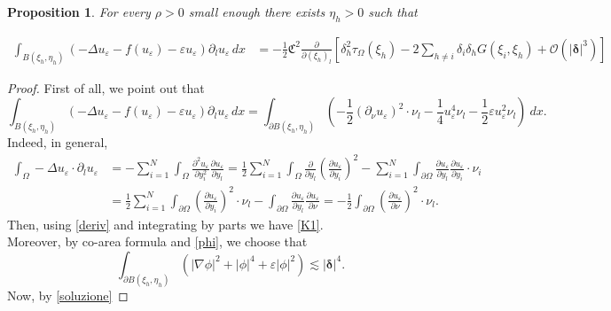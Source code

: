\documentclass[11pt,a4paper]{amsart}
\newcommand{\e}{\varepsilon}
\renewcommand{\d }{\delta }
\renewcommand{\O}{\mathcal{O}}
\newtheorem{proposition}[theorem]{Proposition}
\theoremstyle{definition}
\renewcommand{\(}{\left(}
\renewcommand{\)}{\right)}
\begin{document}
\begin{proposition}\label{espansione2}
For every $\rho>0$ small enough there exists $\eta_h>0$ such that 

\begin{equation}\label{sysj}\begin{aligned}
\int_{B(\xi_h, \eta_h)} \left(-\Delta u_\e -f(u_\e)-\e u_\e\right)\partial_l u_\e\, dx &= -\frac 12\mathfrak C^2\frac{\partial}{\partial(\xi_h)_l}\left[\d_h^2\tau_\Omega(\xi_h)-2\sum_{h\neq i}\d_i\d_hG(\xi_i,\xi_h)+\O\(|\pmb\d|^3\)\right]
\end{aligned}
\end{equation}
\end{proposition}
\begin{proof}
First of all, we point out that
\begin{equation}\label{K1}
\int_{B(\xi_h, \eta_h)} \left(-\Delta u_\e -f(u_\e)-\e u_\e\right)\partial_l u_\e\, dx = \int_{\partial B(\xi_h, \eta_h)} \left( -\frac{1}{2} (\partial_{\nu} u_{\e})^{2} \cdot \nu_l - \frac{1}{4} u_\e^{4} \nu_{l} - \frac{1}{2} \e u_\e^{2} \nu_l \right) \ dx.
\end{equation} 
Indeed, in general, 
\begin{equation}\label{deriv}
\begin{aligned}
\int_{\Omega} - \Delta u_\e \cdot \partial_l u_\e & = - \sum_{i=1}^{N} \int_{\Omega}  \frac{\partial^2 u_\e}{\partial y_i^2} \frac{\partial u_\e}{\partial y_l} = \frac 12 \sum_{i=1}^{N} \int_{\Omega} \frac{\partial}{\partial y_l} \left( \frac{\partial u_\e}{\partial y_i} \right)^2 - \sum_{i=1}^{N} \int_{\partial \Omega} \frac{\partial u_\e}{\partial y_l} \frac{\partial u_\e}{\partial y_i} \cdot \nu_i
\\& = \frac 12 \sum_{i=1}^{N} \int_{\partial\Omega} \left( \frac{\partial u_\e}{\partial y_i} \right)^2 \cdot \nu_l - \int_{\partial \Omega} \frac{\partial u_\e}{\partial y_l} \frac{\partial u_\e}{\partial \nu} = -\frac 12 \int_{\partial \Omega} \left( \frac{\partial u_\e}{\partial \nu} \right)^2 \cdot \nu_l.
\end{aligned}
\end{equation}
Then, using \eqref{deriv} and integrating by parts we have \eqref{K1}. \ \\
Moreover, by co-area formula and \eqref{phi}, we choose that 
\begin{equation}\label{K2}
\int_{\partial B(\xi_h, \eta_h)} (|\nabla \phi|^{2} + |\phi|^{4} + \e|\phi|^{2}) \lesssim |\pmb\d|^4.
\end{equation}
Now, by \eqref{soluzione}

\end{proof}
\end{document}

